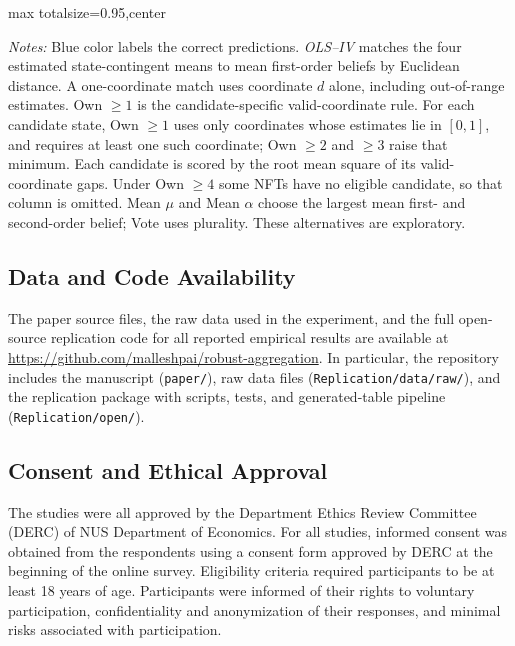 \documentclass[12pt,reqno]{amsart}
\begin{document}
\begin{landscape}
\begin{adjustbox}{max totalsize={\linewidth}{0.95\vsize},center}
\begin{minipage}{\linewidth}
\medskip
{\footnotesize
\renewcommand{\baselinestretch}{1}\selectfont
\raggedright
\textit{Notes:}
Blue color labels the correct predictions.
\textit{OLS--IV} matches the four estimated state-contingent means to mean
first-order beliefs by Euclidean distance.
A one-coordinate match uses coordinate $d$ alone, including
out-of-range estimates.
Own $\geq1$ is the candidate-specific valid-coordinate rule. For each candidate state, Own \(\geq1\) uses only coordinates whose estimates lie in \([0,1]\), and requires at least one such coordinate; Own $\geq2$ and $\geq3$
raise that minimum. Each candidate is scored by the root mean square of its
 valid-coordinate gaps.  Under Own $\geq 4$ some NFTs have no eligible candidate, so that column is omitted. Mean $\mu$ and Mean $\alpha$ choose the largest mean first-
and second-order belief; Vote uses plurality. These alternatives are exploratory.
\par}

\end{minipage}
\end{adjustbox}
\par
\end{landscape}

\clearpage
\subsection{Data and Code Availability}
The paper source files, the raw data used in the experiment, and the full open-source replication code for all reported empirical results are available at \url{https://github.com/malleshpai/robust-aggregation}. In particular, the repository includes the manuscript (\texttt{paper/}), raw data files (\texttt{Replication/data/raw/}), and the replication package with scripts, tests, and generated-table pipeline (\texttt{Replication/open/}).

\subsection{Consent and Ethical Approval}
The studies were all approved by the Department Ethics Review Committee (DERC) of NUS Department of Economics. For all studies, informed consent was obtained from the respondents using a consent form approved by DERC at the beginning of the online survey. Eligibility criteria required participants to be at least 18 years of age. Participants were informed of their rights to voluntary participation, confidentiality and anonymization of their responses, and minimal risks associated with participation.
\end{document}
